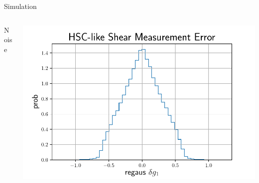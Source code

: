 \documentclass[10pt]{beamer}
\begin{document}
\begin{frame}{Simulation}
\begin{columns}
\begin{column}{0.4\textwidth}

\begin{alertblock}{Noise}

\end{alertblock}

\end{column}
\begin{column}{0.6\textwidth}
\includegraphics[height=.8\textwidth]{../paper_ms_method_HSCY1/shapeMeasurementError-HSCY1.pdf}
\end{column}
\end{columns}
\end{frame}
\end{document}
